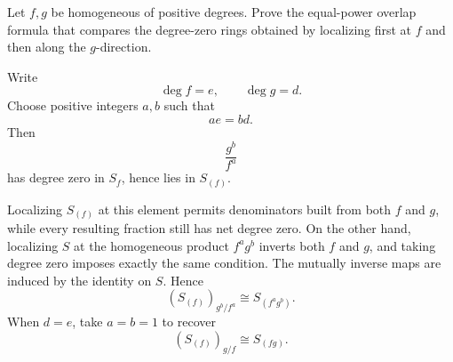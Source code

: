 \begin{problem}\label{prob:vi34-13}
Let \(f,g\) be homogeneous of positive degrees. Prove the equal-power overlap formula that compares the degree-zero
rings obtained by localizing first at \(f\) and then along the \(g\)-direction.

\end{problem}

\ifdefined\FullProblemDossiers
\begin{solution}
Write
\[
\deg f=e,\qquad \deg g=d.
\]
Choose positive integers \(a,b\) such that
\[
ae=bd.
\]
Then
\[
\frac{g^b}{f^a}
\]
has degree zero in \(S_f\), hence lies in \(S_{(f)}\).

Localizing \(S_{(f)}\) at this element permits denominators built from both \(f\) and \(g\), while every resulting
fraction still has net degree zero. On the other hand, localizing \(S\) at the homogeneous product \(f^ag^b\)
inverts both \(f\) and \(g\), and taking degree zero imposes exactly the same condition. The mutually inverse maps
are induced by the identity on \(S\). Hence
\[
\boxed{
(S_{(f)})_{g^b/f^a}\cong S_{(f^ag^b)}.
}
\]
When \(d=e\), take \(a=b=1\) to recover
\[
(S_{(f)})_{g/f}\cong S_{(fg)}.
\]
\end{solution}
\fi
